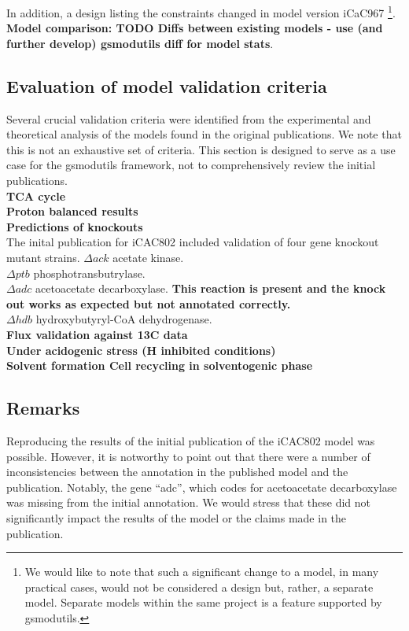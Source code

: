 \documentclass[a4paper,10pt]{article}
\begin{document}
In addition, a design listing the constraints changed in model version iCaC967 
\footnote{We would like to note that such a significant change to a model, in many practical cases, would not be considered a design but, rather, a separate model.
Separate models within the same project is a feature supported by gsmodutils.}.
\\
\textbf{Model comparison: TODO Diffs between existing models - use (and further develop) gsmodutils diff for model stats}.

\subsection{Evaluation of model validation criteria}
Several crucial validation criteria were identified from the experimental and theoretical analysis of the models found in the original publications.
We note that this is not an exhaustive set of criteria.
This section is designed to serve as a use case for the gsmodutils framework, not to comprehensively review the initial publications.
\\

\textbf{TCA cycle}\\
\textbf{Proton balanced results}\\
\textbf{Predictions of knockouts}\\
The inital publication for iCAC802 included validation of four gene knockout mutant strains.
$\Delta ack$ acetate kinase.\\
$\Delta ptb$ phosphotransbutrylase.\\
$\Delta adc$ acetoacetate decarboxylase. \textbf{This reaction is present and the knock out works as expected but not annotated correctly.}\\
$\Delta hdb$ hydroxybutyryl-CoA dehydrogenase. \\

\textbf{Flux validation against 13C data}\\
\textbf{Under acidogenic stress (H inhibited conditions) } \\
\textbf{Solvent formation Cell recycling in solventogenic phase}\\


\subsection{Remarks} 
Reproducing the results of the initial publication of the iCAC802 model \cite{dash2014capturing} was possible.
However, it is notworthy to point out that there were a number of inconsistencies between the annotation in the published model and the publication.
Notably, the gene ``adc'', which codes for acetoacetate decarboxylase was missing from the initial annotation.
We would stress that these did not significantly impact the results of the model or the claims made in the publication.
 
\end{document}
